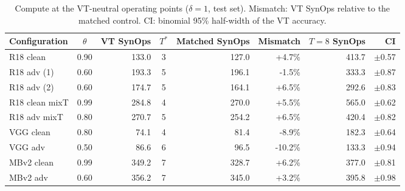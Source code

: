 \begin{table}[htbp]
\centering
\caption[Compute at the VT-neutral operating points]{Compute at the VT-neutral operating points ($\delta = 1$, test set). Mismatch: VT SynOps relative to the matched control. CI: binomial 95\% half-width of the VT accuracy.}
\label{tab:app-neutral-synops}
\footnotesize
\begin{tabular}{@{}l c r c r r r r@{}}
\toprule
Configuration & $\theta$ & VT SynOps & $T^*$ & Matched SynOps & Mismatch & $T{=}8$ SynOps & CI \\
\midrule
R18 clean & 0.90 & 133.0 & 3 & 127.0 & +4.7\% & 413.7 & $\pm$0.57 \\
R18 adv (1) & 0.60 & 193.3 & 5 & 196.1 & -1.5\% & 333.3 & $\pm$0.87 \\
R18 adv (2) & 0.60 & 174.7 & 5 & 164.1 & +6.5\% & 292.6 & $\pm$0.83 \\
R18 clean mixT & 0.99 & 284.8 & 4 & 270.0 & +5.5\% & 565.0 & $\pm$0.62 \\
R18 adv mixT & 0.80 & 270.7 & 5 & 254.2 & +6.5\% & 420.4 & $\pm$0.82 \\
VGG clean & 0.80 & 74.1 & 4 & 81.4 & -8.9\% & 182.3 & $\pm$0.64 \\
VGG adv & 0.50 & 86.6 & 6 & 96.5 & -10.2\% & 133.3 & $\pm$0.94 \\
MBv2 clean & 0.99 & 349.2 & 7 & 328.7 & +6.2\% & 377.0 & $\pm$0.81 \\
MBv2 adv & 0.60 & 356.2 & 7 & 345.0 & +3.2\% & 395.8 & $\pm$0.98 \\
\bottomrule
\end{tabular}
\end{table}


